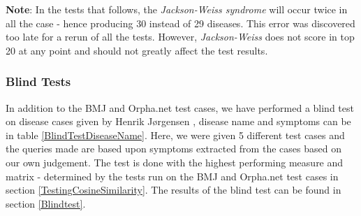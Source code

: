\textbf{Note}: In the tests that follows, the \textit{Jackson-Weiss syndrome} will occur twice in all the case - hence producing 30 instead of 29 diseases. 
This error was discovered too late for a rerun of all the tests. However, \textit{Jackson-Weiss} does not score in top 20 at any point and should not 
greatly affect the test results.

\subsubsection{Blind Tests}
In addition to the BMJ and Orpha.net test cases, we have performed a
blind test on disease cases given by Henrik J\o rgensen
\cite{TheDude}, disease name and symptoms can be in table
\ref{BlindTestDiseaseName}. Here, we were given 5 different test cases
and the queries made are based upon symptoms extracted from the cases
based on our own judgement.  The test is done with the highest
performing measure and matrix - determined by the tests run on the BMJ
and Orpha.net test cases in section \ref{TestingCosineSimilarity}. The
results of the blind test can be found in section \ref{Blindtest}.

